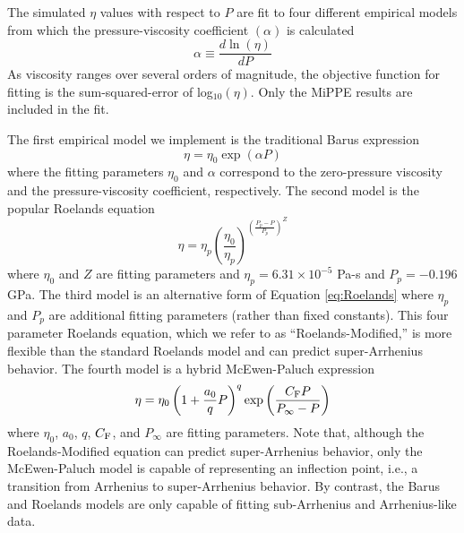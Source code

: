 \documentclass[preprint,review,12pt]{elsarticle}
\begin{document}
    The simulated $\eta$ values with respect to $P$ are fit to four different empirical models from which the pressure-viscosity coefficient $(\alpha)$ is calculated
    \begin{equation}
    \alpha \equiv \frac{d\ln(\eta)}{dP}
    \end{equation}
    As viscosity ranges over several orders of magnitude, the objective function for fitting is the sum-squared-error of log$_{10}(\eta)$. Only the MiPPE results are included in the fit.
    
    
           
    The first empirical model we implement is the traditional Barus expression \cite{Bair2016,Barus1893}
	\begin{equation} \label{eq:Barus}
	\eta = \eta_0 \exp(\alpha P)
	\end{equation}
	where the fitting parameters $\eta_0$ and $\alpha$ correspond to the zero-pressure viscosity and the pressure-viscosity coefficient, respectively. The second model is the popular Roelands equation \cite{Bair2016,Roelands1966}	
	\begin{equation} \label{eq:Roelands}
	\eta = \eta_p \left(\frac{\eta_0}{\eta_p}\right)^{\left(\frac{P_p - P}{P_p}\right)^Z}
	\end{equation}
	where $\eta_0$ and $Z$ are fitting parameters and $\eta_p = 6.31 \times 10^{-5}$ Pa-s and $P_p = -0.196$ GPa. The third model is an alternative form of Equation \ref{eq:Roelands} where $\eta_p$ and $P_p$ are additional fitting parameters (rather than fixed constants). This four parameter Roelands equation, which we refer to as ``Roelands-Modified,'' is more flexible than the standard Roelands model and can predict super-Arrhenius behavior. The fourth model is a hybrid McEwen-Paluch expression \cite{Bair2016}	
	\begin{equation} \label{eq:McEwen-Paluch}
	\eta = \eta_0 \left(1 + \frac{a_0}{q} P\right)^q \exp\left(\frac{C_{\rm F} P}{P_\infty - P}\right)
	\end{equation}
	where $\eta_0$, $a_0$, $q$, $C_{\rm F}$, and $P_\infty$ are fitting parameters.  Note that, although the Roelands-Modified equation can predict super-Arrhenius behavior, only the McEwen-Paluch model is capable of representing an inflection point, i.e., a transition from Arrhenius to super-Arrhenius behavior. By contrast, the Barus and Roelands models are only capable of fitting sub-Arrhenius and Arrhenius-like data.
	
\end{document}
